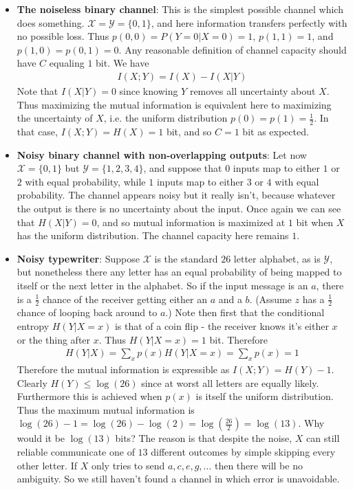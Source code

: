 \begin{itemize}
	\item \textbf{The noiseless binary channel}: This is the simplest possible channel which does something. $\mathcal{X} = \mathcal{Y} = \{0,1\}$, and here information transfers perfectly with no possible loss. Thus $p(0,0) = P(Y = 0|X=0) = 1$, $p(1,1) = 1$, and $p(1,0) = p(0,1) = 0$. Any reasonable definition of channel capacity should have $C$ equaling $1$ bit. We have
	\begin{align}
		I(X;Y) = I(X) - I(X|Y)
	\end{align}
	Note that $I(X|Y) = 0$ since knowing $Y$ removes all uncertainty about $X$. Thus maximizing the mutual information is equivalent here to maximizing the uncertainty of $X$, i.e. the uniform distribution $p(0) = p(1) = \frac{1}{2}$. In that case, $I(X;Y) = H(X) = 1$ bit, and so $C = 1$ bit as expected. 
	\item \textbf{Noisy binary channel with non-overlapping outputs}: Let now $\mathcal{X} = \{0,1\}$ but $\mathcal{Y} = \{1,2,3,4\}$, and suppose that $0$ inputs map to either $1$ or $2$ with equal probability, while $1$ inputs map to either $3$ or $4$ with equal probability. The channel appears noisy but it really isn't, because whatever the output is there is no uncertainty about the input. Once again we can see that $H(X|Y) = 0$, and so mutual information is maximized at $1$ bit when $X$ has the uniform distribution. The channel capacity here remains $1$. 
	\item \textbf{Noisy typewriter}: Suppose $\mathcal{X}$ is the standard $26$ letter alphabet, as is $\mathcal{Y}$, but nonetheless there any letter has an equal probability of being mapped to itself or the next letter in the alphabet. So if the input message is an $a$, there is a $\frac{1}{2}$ chance of the receiver getting either an $a$ and a $b$. (Assume $z$ has a $\frac{1}{2}$ chance of looping back around to $a$.) Note then first that the conditional entropy $H(Y|X=x)$ is that of a coin flip - the receiver knows it's either $x$ or the thing after $x$. Thus $H(Y|X=x) = 1$ bit. Therefore 
	\begin{align}
		H(Y|X) = \sum_x p(x)H(Y|X=x) = \sum_x p(x) = 1
	\end{align}
Therefore the mutual information is expressible as $I(X;Y) = H(Y) - 1$. Clearly $H(Y) \leq \log(26)$ since at worst all letters are equally likely. Furthermore this is achieved when $p(x)$ is itself the uniform distribution. Thus the maximum mutual information is $\log(26)-1 = \log(26) - \log(2) = \log(\frac{26}{2}) = \log(13)$.  Why would it be $\log(13)$ bits? The reason is that despite the noise, $X$ can still reliable communicate one of $13$ different outcomes by simple skipping every other letter. If $X$ only tries to send $a,c,e,g,\ldots$ then there will be no ambiguity. So we still haven't found a channel in which error is unavoidable. 

\end{itemize}
